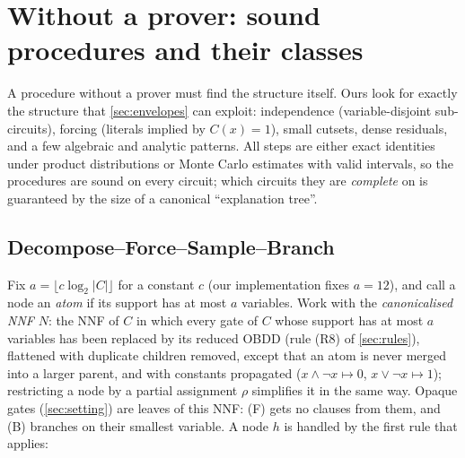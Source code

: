 \section{Without a prover: sound procedures and their classes}\label{sec:part1}

A procedure without a prover must find the structure itself. Ours look for
exactly the structure that \cref{sec:envelopes} can exploit: independence
(variable-disjoint sub-circuits), forcing (literals implied by $C(x)=1$),
small cutsets, dense residuals, and a few algebraic and analytic patterns. All
steps are either exact identities under product distributions or Monte Carlo
estimates with valid intervals, so the procedures are sound on every circuit;
which circuits they are \emph{complete} on is guaranteed by the size of a
canonical ``explanation tree''.

\subsection{Decompose--Force--Sample--Branch}\label{sec:dfsb}

Fix $a=\lfloor c\log_2|C|\rfloor$ for a constant $c$ (our implementation fixes
$a=12$), and call a node an \emph{atom} if its support has at most $a$ variables.
Work with the \emph{canonicalised NNF} $N$: the NNF of $C$ in
which every gate of $C$ whose support has at most $a$ variables has been replaced by
its reduced OBDD (rule (R8) of \cref{sec:rules}), flattened with duplicate children
removed, except that an atom is never merged into a larger parent, and with
constants propagated
($x\wedge\neg x\mapsto0$, $x\vee\neg x\mapsto1$); restricting a node by a partial
assignment $\rho$ simplifies it in the same way. Opaque gates
(\cref{sec:setting}) are leaves of this NNF: (F) gets no clauses from them, and (B)
branches on their smallest variable. A node $h$ is handled by the first rule that
applies:

